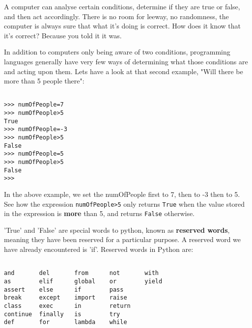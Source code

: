  A computer can analyse certain conditions, determine if they are true or false, and then act accordingly. There is no room for leeway, no randomness, the computer is always sure that what it's doing is correct. How does it know that it's correct? Because you told it it was.

In addition to computers only being aware of two conditions,   programming languages generally have very few ways of determining what   those conditions are and acting upon them. Lets have a look at that second example, "Will there be more than 5 people there":


\begin{lstlisting}

>>> numOfPeople=7
>>> numOfPeople>5
True
>>> numOfPeople=-3
>>> numOfPeople>5
False
>>> numOfPeople=5
>>> numOfPeople>5
False
>>> 

		\end{lstlisting}

In the above example, we set the numOfPeople first to 7, then to -3 then to 5. See how the expression 
\texttt{numOfPeople>5} only returns 
\texttt{True} when the value stored in the expression is \textbf{more} than 5, and returns 
\texttt{False} otherwise.    

'True' and 'False' are special words to python, known as   \textbf{reserved words}, meaning they have been reserved for a   particular purpose. A reserved word we have already encountered is   'if'. Reserved words in Python are:
\begin{lstlisting}

and       del       from      not       with
as        elif      global    or        yield
assert    else      if        pass      
break     except    import    raise
class     exec      in        return
continue  finally   is        try
def       for       lambda    while
                \end{lstlisting}

